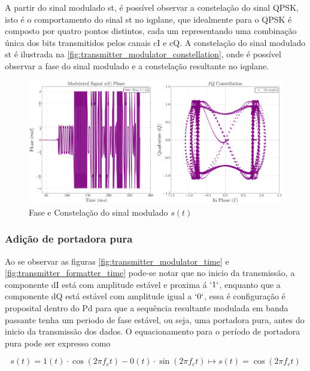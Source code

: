 A partir do sinal modulado \gls{st}, é possível observar a constelação do sinal \gls{QPSK}, isto é o comportamento do sinal \gls{st} no \gls{iqplane}, que idealmente para o \gls{QPSK} é composto por quatro pontos distintos, cada um representando uma combinação única dos bits transmitidos pelos canais \gls{cI} e \gls{cQ}. A constelação do sinal modulado \gls{st} é ilustrada na \autoref{fig:transmitter_modulator_constellation}, onde é possível observar a fase do sinal modulado e a constelação resultante no \gls{iqplane}.


\begin{figure}[H]
	\centering
	\caption{Fase e Constelação do sinal modulado $s(t)$}\label{fig:transmitter_modulator_constellation}
	\includegraphics[width=\linewidth]{assets/cap3/transmitter_modulator_constellation.pdf}
\end{figure}


\subsubsection{Adição de portadora pura}

Ao se observar as figuras \ref{fig:transmitter_modulator_time} e \ref{fig:transmitter_formatter_time} pode-se notar que no inicio da transmissão, a componente \gls{dI} está com amplitude estável e proxima á $`1`$, enquanto que a componente \gls{dQ} está estável com amplitude igual a $`0`$, essa é configuração é proposital dentro do \gls{Pd} para que a sequência resultante modulada em banda passante tenha um periodo de fase estável, ou seja, uma portadora pura, antes do inicio da transmissão dos dados. O equacionamento para o período de portadora pura pode ser expresso como

\begin{equation}
    s(t) = 1(t) \cdot \cos(2\pi f_c t) - 0(t) \cdot \sin(2\pi f_c t) \mapsto s(t) = \cos(2\pi f_c t)
\end{equation}

